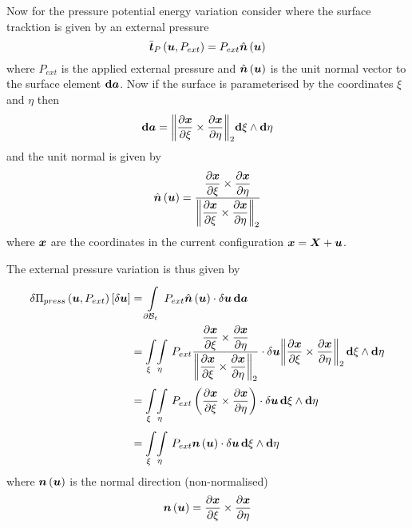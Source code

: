 Now for the pressure potential energy variation consider where the surface
tracktion is given by an external pressure \ie
\begin{equation}
  \fnof{\bar{\vectr{t}}_{P}}{\vectr{u},P_{ext}}=P_{ext}\fnof{\hat{\vectr{n}}}{\vectr{u}}
\end{equation}
where $P_{ext}$ is the applied external pressure and $\fnof{\hat{\vectr{n}}}{\vectr{u}}$ is the
unit normal vector to the surface element $\exteriorderiv{\covectr{a}}$. Now
if the surface is parameterised by the coordinates $\xi$ and $\eta$ then
\begin{equation}
  \exteriorderiv{\covectr{a}}=
  \norm{\crossprod{\delby{\vectr{x}}{\xi}}{\delby{\vectr{x}}{\eta}}}
  \wedgeprod{\exteriorderiv{\xi}}{\exteriorderiv{\eta}}
\end{equation}
and the unit normal is given by
\begin{equation}
  \fnof{\hat{\vectr{n}}}{\vectr{u}}=\dfrac{\crossprod{\delby{\vectr{x}}{\xi}}{\delby{\vectr{x}}{\eta}}}{
    \norm{\crossprod{\delby{\vectr{x}}{\xi}}{\delby{\vectr{x}}{\eta}}}}
\end{equation}
where $\vectr{x}$ are the coordinates in the current configuration \ie $\vectr{x}=\vectr{X}+\vectr{u}$.

The external pressure variation is thus given by
\begin{equation}
  \begin{split}
    \variation{\fnof{\Pi_{press}}{\vectr{u},P_{ext}}}{\vectr{u}}&=
    \gint{\boundary{\embedmanifold{B}}_{t}}{}{\dotprod{P_{ext}\fnof{\hat{\vectr{n}}}{\vectr{u}}}{
        \delta\vectr{u}}}{\covectr{a}}\\
    &=\giint{\xi}{}{\eta}{}{\dotprod{P_{ext}\dfrac{\crossprod{\delby{\vectr{x}}{\xi}}{\delby{\vectr{x}}{\eta}}}{\norm{\crossprod{\delby{\vectr{x}}{\xi}}{\delby{\vectr{x}}{\eta}}}}}{\delta\vectr{u}}\norm{\crossprod{\delby{\vectr{x}}{\xi}}{\delby{\vectr{x}}{\eta}}}}{\xi}{\eta} \\
    &=\giint{\xi}{}{\eta}{}{\dotprod{P_{ext}\pbrac{\crossprod{\delby{\vectr{x}}{\xi}}{\delby{\vectr{x}}{\eta}}}}{\delta\vectr{u}}}{\xi}{\eta}\\
    &=\giint{\xi}{}{\eta}{}{\dotprod{P_{ext}\fnof{\vectr{n}}{\vectr{u}}}{\delta\vectr{u}}}{\xi}{\eta}
  \end{split}
\end{equation}
where $\fnof{\vectr{n}}{\vectr{u}}$ is the normal direction (non-normalised) \ie
\begin{equation}
  \fnof{\vectr{n}}{\vectr{u}}=\crossprod{\delby{\vectr{x}}{\xi}}{\delby{\vectr{x}}{\eta}}
\end{equation}


